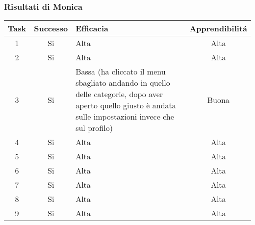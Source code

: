 \documentclass[../Report.tex]{subfiles}
\begin{document}
    \subsubsection{Risultati di Monica}
    \begin{table}[H]
        \begin{tabular}{|c|c|p{5cm}|c|}
            \hline
            Task & Successo & Efficacia & Apprendibilitá \\
            \hline
            1 & Si & Alta & Alta \\
            \hline
            2 & Si & Alta & Alta  \\
            \hline
            3 & Si & Bassa (ha cliccato il menu sbagliato andando in quello delle categorie, dopo aver aperto quello giusto è andata sulle impostazioni invece che sul profilo)  & Buona  \\
            \hline
            4 & Si & Alta & Alta  \\
            \hline
            5 & Si & Alta & Alta  \\
            \hline
            6 & Si & Alta & Alta  \\
            \hline
            7 & Si & Alta & Alta  \\
            \hline
            8 & Si & Alta & Alta  \\
            \hline
            9 & Si & Alta & Alta  \\
            \hline
        \end{tabular}

        
    \end{table}
\end{document}
